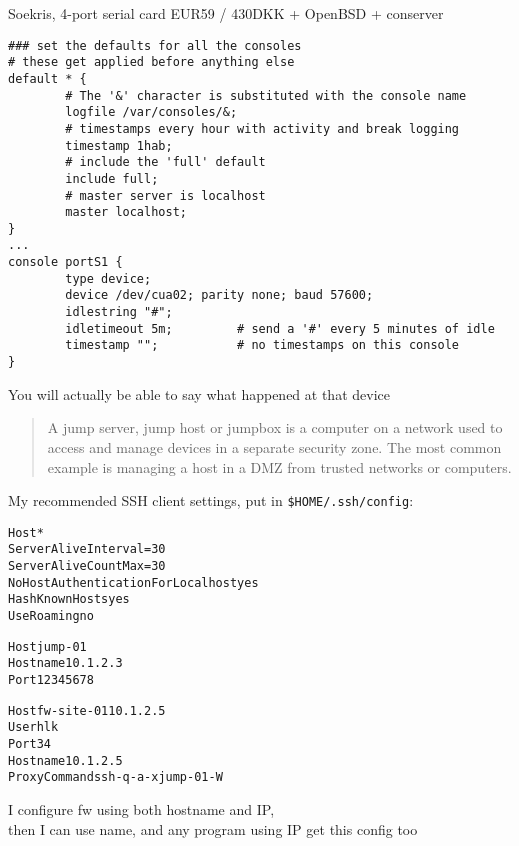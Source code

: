 \documentclass[Screen16to9,17pt]{foils}
\begin{document}


\centerline{Soekris, 4-port serial card EUR59 / 430DKK + OpenBSD + conserver}

\footnotesize
\begin{verbatim}
### set the defaults for all the consoles
# these get applied before anything else
default * {
        # The '&' character is substituted with the console name
        logfile /var/consoles/&;
        # timestamps every hour with activity and break logging
        timestamp 1hab;
        # include the 'full' default
        include full;
        # master server is localhost
        master localhost;
}
...
console portS1 {
        type device;
        device /dev/cua02; parity none; baud 57600;
        idlestring "#";
        idletimeout 5m;         # send a '#' every 5 minutes of idle
        timestamp "";           # no timestamps on this console
}
\end{verbatim}
\normalsize

\centerline{You will actually be able to say what happened at that device}




\begin{quote}
A jump server, jump host or jumpbox is a computer on a network used to access and manage devices in a separate security zone. The most common example is managing a host in a DMZ from trusted networks or computers.
\end{quote}




My recommended SSH client settings, put in \verb+$HOME/.ssh/config+:
\begin{alltt}\footnotesize
Host *
    ServerAliveInterval=30
    ServerAliveCountMax=30
    NoHostAuthenticationForLocalhost yes
    HashKnownHosts yes
    UseRoaming no

Host jump-01
  Hostname 10.1.2.3
  Port 12345678

Host fw-site-01 10.1.2.5
  User hlk
  Port 34
  Hostname 10.1.2.5
  ProxyCommand ssh -q -a -x jump-01 -W %h:%p
\end{alltt}

I configure fw using both hostname and IP,\\
then I can use name, and any program using IP get this config too
\end{document}
